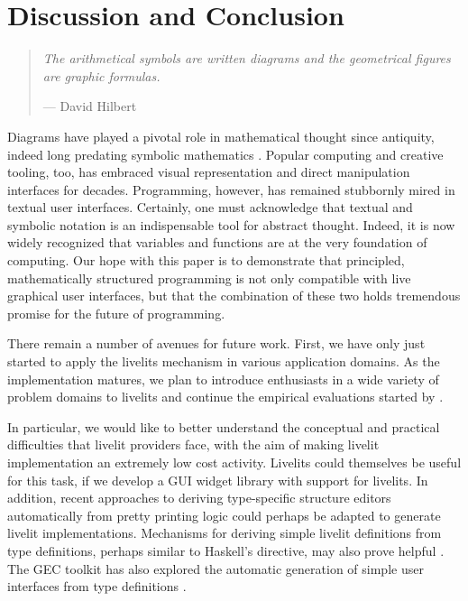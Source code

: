\section{Discussion and Conclusion}\label{sec:discussion}\label{sec:conclusion}
\begin{quote}
  \textit{
  The arithmetical symbols are written diagrams and the geometrical figures are graphic formulas.
  }
  
  \vspace{3pt}
  
  \hfill{}--- David Hilbert~\cite{hilbert1902mathematical}
  \end{quote}

  Diagrams have played a pivotal role in mathematical thought since antiquity,
  indeed long predating symbolic mathematics \cite{cajori1993history}. 
  Popular computing and creative tooling, too, has embraced visual representation and direct manipulation 
  interfaces for decades.
  Programming, however, has remained stubbornly mired in textual user interfaces. 
  Certainly, one must acknowledge that textual and symbolic notation
  is an indispensable tool for abstract thought. 
  Indeed, it is now widely recognized that variables and functions are at the 
  very foundation of computing. 
  Our hope with this paper is to demonstrate that principled, mathematically structured
  programming is not only compatible with live graphical user interfaces, but that the 
  combination of these two holds tremendous promise for the future of programming.

  There remain a number of avenues for future work. First, we have only just started
  to apply the livelits mechanism in various application domains. As the implementation
  matures, we plan to introduce enthusiasts in a wide variety of problem domains
  to livelits and continue the empirical evaluations started by \citet{Graphite}.

  In particular, we would like to better understand the conceptual and practical 
  difficulties that livelit providers face, with the aim of making livelit 
  implementation an extremely low cost activity. Livelits could themselves be 
  useful for this task, if we develop a GUI widget library with support for livelits.
In addition, recent approaches to deriving type-specific structure editors automatically from pretty printing logic \cite{hempeltiny} could perhaps 
be adapted to generate livelit implementations. Mechanisms for deriving simple 
livelit definitions from type definitions, perhaps similar to Haskell's  directive, 
may also prove helpful \cite{magalhaes2010generic}. The GEC toolkit has also explored  
the automatic generation of simple user interfaces from type definitions \cite{DBLP:conf/afp/AchtenEPW04}.

